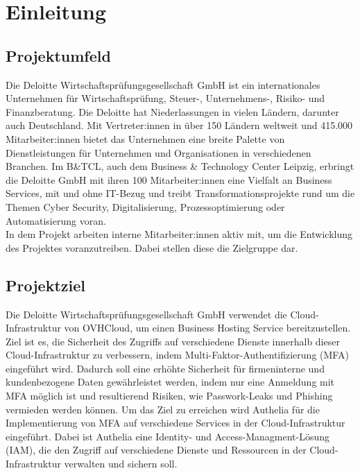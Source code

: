 \section{Einleitung}
\label{sec:Einleitung}


\subsection{Projektumfeld} 
\label{sec:Projektumfeld}
Die Deloitte Wirtschaftsprüfungsgesellschaft GmbH ist ein internationales 
Unternehmen für Wirtschaftsprüfung, Steuer-, Unternehmens-, Risiko- und Finanzberatung.
Die Deloitte hat Niederlassungen in vielen Ländern, darunter auch Deutschland. 
Mit Vertreter:innen in über 150 Ländern weltweit und 415.000 Mitarbeiter:innen bietet das Unternehmen eine breite Palette 
von Dienstleistungen für Unternehmen und Organisationen in verschiedenen Branchen.
Im B\&TCL, auch dem Business \& Technology Center Leipzig, erbringt die Deloitte
GmbH mit ihren 100 Mitarbeiter:innen eine Vielfalt an Business Services, mit und ohne IT-Bezug und treibt
Transformationsprojekte rund um die Themen Cyber Security, Digitalisierung,
Prozessoptimierung oder Automatisierung voran.
\\In dem Projekt arbeiten interne Mitarbeiter:innen aktiv mit, um die Entwicklung des
Projektes voranzutreiben. Dabei stellen diese die Zielgruppe dar.


\subsection{Projektziel} 
\label{sec:Projektziel}
Die Deloitte Wirtschaftsprüfungsgesellschaft GmbH verwendet die Cloud-Infrastruktur
von OVHCloud, um einen Business Hosting Service bereitzustellen. 
\\Ziel ist es, die Sicherheit des Zugriffs auf verschiedene Dienste 
innerhalb dieser Cloud-Infrastruktur zu verbessern, indem 
Multi-Faktor-Authentifizierung (MFA) eingeführt wird. 
Dadurch soll eine erhöhte Sicherheit für firmeninterne und kundenbezogene 
Daten gewährleistet werden, indem nur eine Anmeldung mit MFA möglich ist und resultierend Risiken, 
wie Passwork-Leaks und Phishing vermieden werden können.
Um das Ziel zu erreichen wird Authelia für die Implementierung von MFA auf verschiedene Services 
in der Cloud-Infrastruktur eingeführt. 
Dabei ist Authelia eine Identity- und Access-Managment-Lösung (IAM), die den Zugriff auf 
verschiedene Dienste und Ressourcen in der Cloud-Infrastruktur verwalten und sichern soll. 


